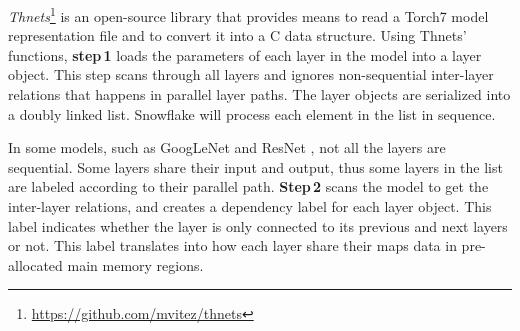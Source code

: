 \documentclass{sig-alternate}
\begin{document}




\emph{Thnets}\footnote{\url{https://github.com/mvitez/thnets}} is an open-source library that provides means to read a Torch7 model representation file and to convert it into a C data structure. Using Thnets' functions, \textbf{step\,1} loads the parameters of each layer in the model into a layer object. This step scans through all layers and ignores non-sequential inter-layer relations that happens in parallel layer paths. The layer objects are serialized into a doubly linked list. Snowflake will process each element in the list in sequence.

In some models, such as GoogLe\-Net \cite{googlenet} and ResNet \cite{resnet}, not all the layers are sequential. Some layers share their input and output, thus some layers in the list are labeled according to their parallel path. \textbf{Step\,2} scans the model to get the inter-layer relations, and creates a dependency label for each layer object. This label indicates whether the layer is only connected to its previous and next layers or not. This label translates into how each layer share their maps data in pre-allocated main memory regions.

\end{document}
